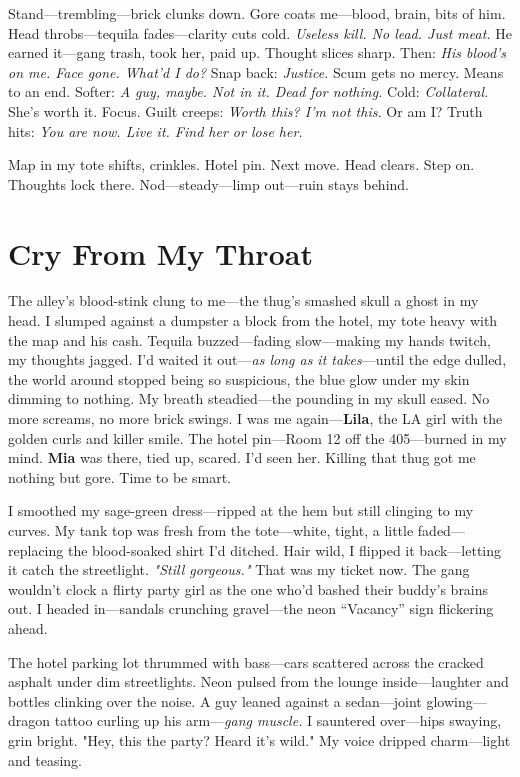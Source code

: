 \documentclass{article}
\begin{document}
Stand—trembling—brick clunks down. Gore coats me—blood, brain, bits of him. Head throbs—tequila fades—clarity cuts cold. \textit{Useless kill. No lead. Just meat.} He earned it—gang trash, took her, paid up. Thought slices sharp. Then: \textit{His blood’s on me. Face gone. What’d I do?} Snap back: \textit{Justice.} Scum gets no mercy. Means to an end. Softer: \textit{A guy, maybe. Not in it. Dead for nothing.} Cold: \textit{Collateral.} She’s worth it. Focus. Guilt creeps: \textit{Worth this? I’m not this.} Or am I? Truth hits: \textit{You are now. Live it. Find her or lose her.}

Map in my tote shifts, crinkles. Hotel pin. Next move. Head clears. Step on. Thoughts lock there. Nod—steady—limp out—ruin stays behind.

\section*{Cry From My Throat}

The alley’s blood-stink clung to me—the thug’s smashed skull a ghost in my head. I slumped against a dumpster a block from the hotel, my tote heavy with the map and his cash. Tequila buzzed—fading slow—making my hands twitch, my thoughts jagged. I’d waited it out—\textit{as long as it takes}—until the edge dulled, the world around stopped being so suspicious, the blue glow under my skin dimming to nothing. My breath steadied—the pounding in my skull eased. No more screams, no more brick swings. I was me again—\textbf{Lila}, the LA girl with the golden curls and killer smile. The hotel pin—Room 12 off the 405—burned in my mind. \textbf{Mia} was there, tied up, scared. I’d seen her. Killing that thug got me nothing but gore. Time to be smart.

I smoothed my sage-green dress—ripped at the hem but still clinging to my curves. My tank top was fresh from the tote—white, tight, a little faded—replacing the blood-soaked shirt I’d ditched. Hair wild, I flipped it back—letting it catch the streetlight. \textit{"Still gorgeous."} That was my ticket now. The gang wouldn’t clock a flirty party girl as the one who’d bashed their buddy’s brains out. I headed in—sandals crunching gravel—the neon “Vacancy” sign flickering ahead.

The hotel parking lot thrummed with bass—cars scattered across the cracked asphalt under dim streetlights. Neon pulsed from the lounge inside—laughter and bottles clinking over the noise. A guy leaned against a sedan—joint glowing—dragon tattoo curling up his arm—\textit{gang muscle.} I sauntered over—hips swaying, grin bright. "Hey, this the party? Heard it’s wild." My voice dripped charm—light and teasing.
\end{document}
